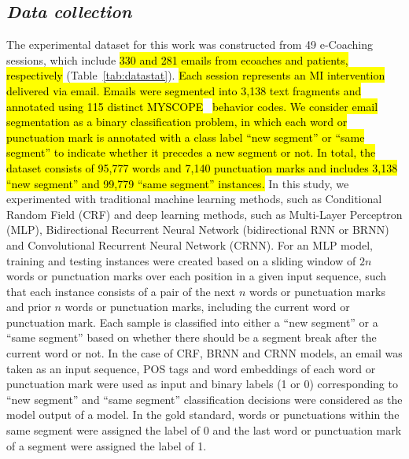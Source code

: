 \documentclass{amia}
\begin{document}
\subsection*{\textit{Data collection}}
The experimental dataset for this work was constructed from 49 e-Coaching sessions, which include \hl{330 and 281 emails from ecoaches and patients, respectively }(Table~\ref{tab:datastat}). \hl{Each session represents an MI intervention delivered via email. Emails were segmented into 3,138 text fragments and annotated using 115 distinct MYSCOPE}~\cite{carcone2013provider} \hl{behavior codes. We consider email segmentation as a binary classification problem, in which each word or punctuation mark is annotated with a class label ``new segment'' or ``same segment'' to indicate whether it precedes a new segment or not. In total, the dataset consists of 95,777 words and 7,140 punctuation marks and includes 3,138 ``new segment'' and 99,779 ``same segment'' instances.} In this study, we experimented with traditional machine learning methods, such as Conditional Random Field (CRF)\cite{lafferty2001conditional} and deep learning methods, such as Multi-Layer Perceptron (MLP),\cite{rumelhart1986learning} Bidirectional Recurrent Neural Network (bidirectional RNN or BRNN)\cite{schuster1997bidirectional} and Convolutional Recurrent Neural Network (CRNN).\cite{treviso2017sentence} For an MLP model, training and testing instances were created based on a sliding window of $2n$ words or punctuation marks over each position in a given input sequence, such that each instance consists of a pair of the next $n$ words or punctuation marks and prior $n$ words or punctuation marks, including the current word or punctuation mark. Each sample is classified into either a ``new segment'' or a ``same segment'' based on whether there should be a segment break after the current word or not. In the case of CRF, BRNN and CRNN models, an email was taken as an input sequence, POS tags and word embeddings of each word or punctuation mark were used as input and binary labels (1 or 0) corresponding to ``new segment'' and ``same segment'' classification decisions were considered as the model output of a model. In the gold standard, words or punctuations within the same segment were assigned the label of 0 and the last word or punctuation mark of a segment were assigned the label of 1. \\ 
\end{document}
